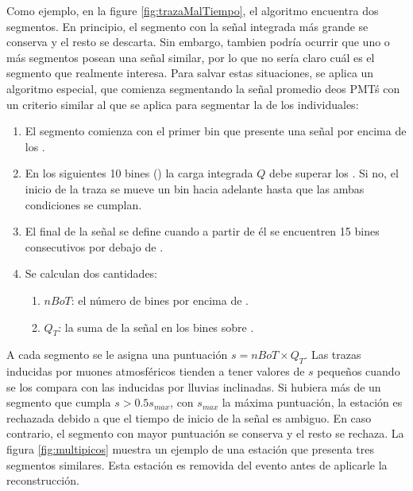 		Como ejemplo, en la figure \ref{fig:trazaMalTiempo}, el algoritmo encuentra dos segmentos.
		En principio, el segmento con la señal integrada más grande se conserva y el resto se descarta.
		Sin embargo, tambien podría ocurrir que uno o más segmentos posean una señal similar, por lo que no sería claro cuál es el segmento que realmente interesa.
		Para salvar estas situaciones, se aplica un algoritmo especial, que comienza segmentando la señal promedio deos PMT\'s con un criterio similar al que se aplica para segmentar la de los individuales:
		\begin{enumerate}
		 \item El segmento comienza con el primer bin que presente una señal por encima de los .
		 \item En los siguientes 10 bines () la carga integrada $Q$ debe superar los . Si no, el inicio de la traza se mueve un bin hacia adelante hasta que las ambas condiciones se cumplan.
		 \item El final de la señal se define cuando a partir de él se encuentren 15 bines consecutivos por debajo de .
		 \item Se calculan dos cantidades:
		 \begin{enumerate}
		  \item $nBoT$: el número de bines por encima de .
		  \item $Q_T$: la suma de la señal en los bines sobre .
		 \end{enumerate}
		\end{enumerate}
		A cada segmento se le asigna una puntuación $s=nBoT\times Q_T$. 
		Las trazas inducidas por muones atmosféricos tienden a tener valores de $s$ pequeños cuando se los compara con las inducidas por lluvias inclinadas.
		Si hubiera más de un segmento que cumpla $s>0.5s_{max}$, con $s_{max}$ la máxima puntuación, la estación es rechazada debido a que el tiempo de inicio de la señal es ambiguo.
		En caso contrario, el segmento con mayor puntuación se conserva y el resto se rechaza.
		La figura \ref{fig:multipicos} muestra un ejemplo de una estación que presenta tres segmentos similares. Esta estación es removida del evento antes de aplicarle la reconstrucción.
